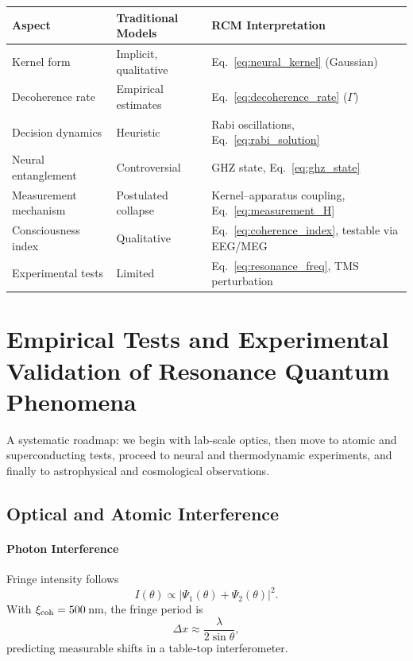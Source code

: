 \begin{center}
\begin{tabular}{l|l|l}
\bf Aspect & \bf Traditional Models & \bf RCM Interpretation \\ \hline
Kernel form               & Implicit, qualitative  
                          & Eq.~\eqref{eq:neural_kernel} (Gaussian) \\[4pt]
Decoherence rate          & Empirical estimates  
                          & Eq.~\eqref{eq:decoherence_rate} (\(\Gamma\)) \\[4pt]
Decision dynamics         & Heuristic  
                          & Rabi oscillations, Eq.~\eqref{eq:rabi_solution} \\[4pt]
Neural entanglement       & Controversial  
                          & GHZ state, Eq.~\eqref{eq:ghz_state} \\[4pt]
Measurement mechanism     & Postulated collapse  
                          & Kernel–apparatus coupling, Eq.~\eqref{eq:measurement_H} \\[4pt]
Consciousness index       & Qualitative  
                          & Eq.~\eqref{eq:coherence_index}, testable via EEG/MEG \\[4pt]
Experimental tests        & Limited  
                          & Eq.~\eqref{eq:resonance_freq}, TMS perturbation  \\  
\end{tabular}
\end{center}

\section{Empirical Tests and Experimental Validation of Resonance Quantum Phenomena}

A systematic roadmap: we begin with lab‐scale optics, then move to atomic and superconducting tests, proceed to neural and thermodynamic experiments, and finally to astrophysical and cosmological observations.

\subsection{Optical and Atomic Interference}

\paragraph{Photon Interference}  
Fringe intensity follows
\begin{equation}\label{eq:fringe}
I(\theta) \propto \bigl|\Psi_1(\theta) + \Psi_2(\theta)\bigr|^2.
\tag{1}
\end{equation}
With $\xi_{\rm coh}=500\,$nm, the fringe period is 
\[
\Delta x \approx \frac{\lambda}{2\sin\theta},
\]
predicting measurable shifts in a table‐top interferometer.

